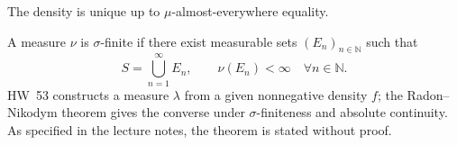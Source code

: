 The density is unique up to $\mu$-almost-everywhere equality.

\par\noindent{}%
%
\par\nobreak
 A measure $\nu$ is $\sigma$-finite if there exist measurable sets $(E_n)_{n\in\mathbb N}$ such that
\[
S=\bigcup_{n=1}^{\infty}E_n,
\qquad\nu(E_n)<\infty\quad\forall n\in\mathbb N.
\]
HW~53 constructs a measure $\lambda$ from a given nonnegative density $f$; the Radon--Nikodym theorem gives the converse under $\sigma$-finiteness and absolute continuity. As specified in the lecture notes, the theorem is stated without proof.
